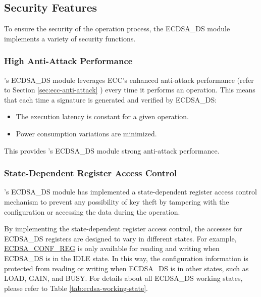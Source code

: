 \documentclass[main\_\_EN.tex]{subfiles}
\begin{document}

\subsection{Security Features}
\label{sec:ecdsa-security_features}

To ensure the security of the operation process, the ECDSA\_DS module implements a variety of security functions.

\subsubsection{High Anti-Attack Performance}

\chipseries{}'s ECDSA\_DS module leverages ECC's enhanced anti-attack performance (refer to Section \ref{sec:ecc-anti-attack} \textit{}) every time it performs an operation. This means that each time a signature is generated and verified by ECDSA\_DS:

\begin{itemize}
    \item The execution latency is constant for a given operation.
    \item Power consumption variations are minimized.
\end{itemize}

This provides \chipseries{}'s ECDSA\_DS module strong anti-attack performance.

\subsubsection{State-Dependent Register Access Control}

\chipseries{}'s ECDSA\_DS module has implemented a state-dependent register access control mechanism to prevent any possibility of key theft by tampering with the configuration or accessing the data during the operation.

By implementing the state-dependent register access control, the accesses for ECDSA\_DS registers are designed to vary in different states. For example, \hyperref[regdesc:ECDSACONFREG]{ECDSA\_CONF\_REG} is only available for reading and writing when ECDSA\_DS is in the IDLE state. In this way, the configuration information is protected from reading or writing when ECDSA\_DS is in other states, such as LOAD, GAIN, and BUSY. For details about all ECDSA\_DS working states, please refer to Table \ref{tab:ecdsa-working-state}.
\end{document}
